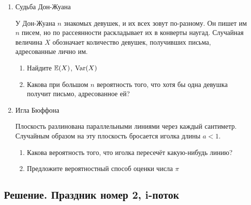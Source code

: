 \documentclass[12pt, a4paper]{article}\usepackage[]{graphicx}\usepackage[]{color}
\begin{document}
\begin{enumerate}
					\item  Судьба Дон-Жуана


					У Дон-Жуана $n$  знакомых девушек, и их всех зовут по-разному. Он пишет
					им $n$  писем, но по рассеянности раскладывает их в конверты
					наугад. Случайная величина $X$ обозначает количество девушек, получивших письма, адресованные лично им.

					\begin{enumerate}
						\item Найдите $\mathbb{E}(X)$, $\operatorname{Var}(X)$
						\item Какова при большом $n$ вероятность того, что хотя бы одна девушка получит письмо, адресованное ей?
					\end{enumerate}

					\item Игла Бюффона

					Плоскость разлинована параллельными линиями через каждый сантиметр. Случайным образом на эту плоскость бросается иголка длины $a<1$.

					\begin{enumerate}
						\item Какова вероятность того, что иголка пересечёт какую-нибудь линию?
						\item Предложите вероятностный способ оценки числа $\pi$
					\end{enumerate}


				\end{enumerate}


				\subsection{Решение. Праздник номер 2, i-поток}
\end{document}

